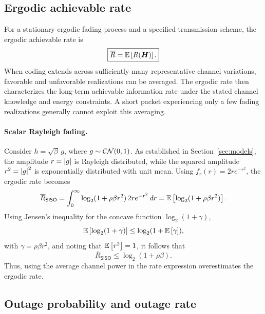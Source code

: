 \subsection{Ergodic achievable rate}

For a stationary ergodic fading process and a specified transmission scheme, the ergodic achievable rate is
\begin{equation}\label{eq:ergodic}
	\boxed{
		\overline R=\mathbb{E}\left[R(\bm{H})\right].
	}
\end{equation}
When coding extends across sufficiently many representative channel variations, favorable and unfavorable realizations can be averaged. The ergodic rate then characterizes the long-term achievable information rate under the stated channel knowledge and energy constraints. A short packet experiencing only a few fading realizations generally cannot exploit this averaging.


\paragraph{Scalar Rayleigh fading.}
Consider $h=\sqrt{\beta}\,g$, where $g\sim\mathcal{CN}(0,1)$. As established in Section~\ref{sec:models}, the amplitude $r=\left|g\right|$ is Rayleigh distributed, while the squared amplitude $r^2=\left|g\right|^2$ is exponentially distributed with unit mean.
%
Using $f_r(r)=2re^{-r^2}$, the ergodic rate becomes
\begin{equation}\label{eq:sisoergodic}
	\overline R_{\mathsf{SISO}}
	=\int_0^\infty
	\log_2(1+\rho\beta r^2)\,
	2re^{-r^2}\,dr
	=\mathbb{E}\left[\log_2(1+\rho\beta r^2)\right].
\end{equation}
Using Jensen's inequality for the concave function $\log_2(1+\gamma)$,
\begin{equation*}
	\mathbb{E}\left[\log_2(1+\gamma)\right]
	\leq\log_2(1+\mathbb{E}\left[\gamma\right]),
\end{equation*}
with $\gamma=\rho\beta r^2$, and noting that $\mathbb{E}\left[r^2\right]=1$, it follows that
\begin{equation}
	\boxed{\overline R_{\mathsf{SISO}}
	\leq\log_2(1+\rho\beta).}
\end{equation}
Thus, using the average channel power in the rate expression overestimates the ergodic rate.
\subsection{Outage probability and outage rate}

